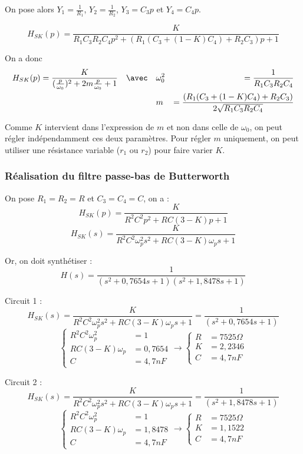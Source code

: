 \documentclass[../../Cours_M1.tex]{subfiles}
\begin{document}
On pose alors $Y_1 = \frac{1}{R_1}$, $Y_2=\frac{1}{R_2}$, $Y_3 = C_3p$ et $Y_4=C_4p$.

\[ H_{SK}(p) = \frac{K}{R_1C_3R_2C_4p^2 + (R_1(C_3+(1-K)C_4)+R_2C_3)p+1} \]

On a donc
\begin{eqnarray*}
H_{SK}(p) = \frac{K}{(\frac{p}{\omega_0})^2 + 2m\frac{p}{\omega_0}+1} \quad \avec \quad & \omega_0^2 & = \frac{1}{R_1C_3R_2C_4} \\
& m & = \frac{(R_1(C_3+(1-K)C_4)+R_2C_3)}{2\sqrt{R_1C_3R_2C_4}}
\end{eqnarray*}

\noindent Comme $K$ intervient dans l'expression de $m$ et non dans celle de $\omega_0$, on peut régler indépendamment ces deux paramètres. Pour régler $m$ uniquement, on peut utiliser une résistance variable ($r_1$ ou $r_2$) pour faire varier $K$.

\subsubsection{Réalisation du filtre passe-bas de Butterworth}

On pose $R_1=R_2=R$ et $C_3=C_4=C$, on a :
\[ H_{SK}(p) = \frac{K}{R^2C^2p^2 + RC(3-K)p+1} \]
\[ H_{SK}(s) = \frac{K}{R^2C^2\omega_p^2s^2 + RC(3-K)\omega_ps+1} \]

Or, on doit synthétiser :
\[H(s) = \frac{1}{(s^2+0,7654s+1)(s^2+1,8478s+1)}\]

Circuit 1 :\\
\[H_{SK}(s) = \frac{K}{R^2C^2\omega_p^2s^2 + RC(3-K)\omega_ps+1} = \frac{1}{(s^2+0,7654s+1)}\]
\[
\left\{
\begin{array}{ll}
R^2C^2\omega_p^2 & = 1\\
RC(3-K)\omega_p & = 0,7654 \\
C & = 4,7nF
\end{array}
\right.
\rightarrow
\left\{
\begin{array}{ll}
R & = 7525 \Omega\\
K & = 2,2346 \\
C & = 4,7nF
\end{array}
\right.
\]

Circuit 2 :\\
\[H_{SK}(s) = \frac{K}{R^2C^2\omega_p^2s^2 + RC(3-K)\omega_ps+1} = \frac{1}{(s^2+1,8478s+1)}\]
\[
\left\{
\begin{array}{ll}
R^2C^2\omega_p^2 & = 1\\
RC(3-K)\omega_p & = 1,8478  \\
C & = 4,7nF
\end{array}
\right.
\rightarrow
\left\{
\begin{array}{ll}
R & = 7525 \Omega\\
K & = 1,1522 \\
C & = 4,7nF
\end{array}
\right.
\]
\end{document}
